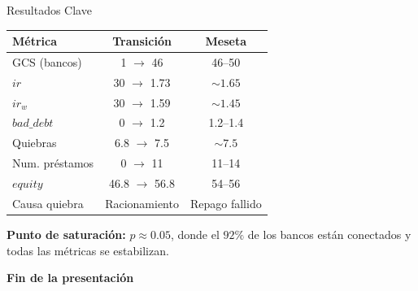 \documentclass[aspectratio=169,10pt]{beamer}
\begin{document}
\begin{frame}{Resultados Clave}
  \begin{center}
    \small
    \begin{tabular}{lcc}
      \toprule
      \textbf{Métrica} & \textbf{Transición} & \textbf{Meseta} \\
      \midrule
      GCS (bancos) & 1 $\to$ 46 & 46--50 \\
      $ir$ & 30 $\to$ 1.73 & $\sim 1.65$ \\
      $ir_w$ & 30 $\to$ 1.59 & $\sim 1.45$ \\
      $bad\_debt$ & 0 $\to$ 1.2 & 1.2--1.4 \\
      Quiebras & 6.8 $\to$ 7.5 & $\sim 7.5$ \\
      Num. préstamos & 0 $\to$ 11 & 11--14 \\
      $equity$ & 46.8 $\to$ 56.8 & 54--56 \\
      Causa quiebra & Racionamiento & Repago fallido \\
      \bottomrule
    \end{tabular}
  \end{center}
  \vspace{0.5cm}
  \small
  \textbf{Punto de saturación:} $p \approx 0.05$, donde el $92\%$
  de los bancos están conectados y todas las métricas se estabilizan.
\end{frame}

\begin{frame}
  \begin{center}
    \Large \textbf{Fin de la presentación}
  \end{center}
\end{frame}
\end{document}
